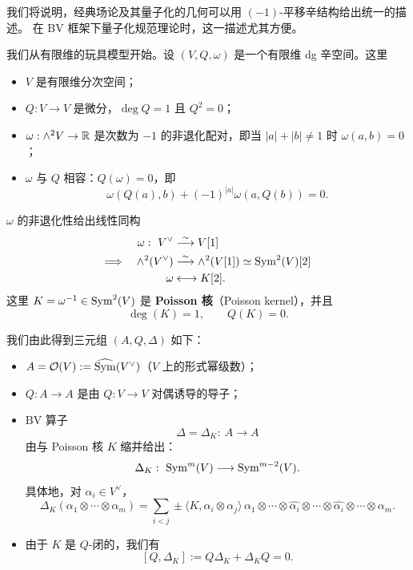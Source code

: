 我们将说明，经典场论及其量子化的几何可以用 $(-1)$-平移辛结构给出统一的描述。
在 BV 框架下量子化规范理论时，这一描述尤其方便。

我们从有限维的玩具模型开始。设 $(V,Q,\omega)$ 是一个有限维 dg 辛空间。这里
\begin{itemize}[leftmargin=1.6em,itemsep=0.2em]
  \item $V$ 是有限维分次空间；
  \item $Q:V\to V$ 是微分，$\deg Q=1$ 且 $Q^2=0$；
  \item $\omega:\wedge^2V\to\mathbb{R}$ 是次数为 $-1$ 的非退化配对，即当 $|a|+|b|\neq 1$ 时
        $\omega(a,b)=0$；
  \item $\omega$ 与 $Q$ 相容：$Q(\omega)=0$，即
        \[
          \omega(Q(a),b)+(-1)^{|a|}\omega(a,Q(b))=0.
        \]
\end{itemize}

$\omega$ 的非退化性给出线性同构
\[
  \begin{aligned}
    \omega:\ V^{\vee}&\overset{\sim}{\longrightarrow}V[1]\\
    \Longrightarrow\quad
    \wedge^2(V^{\vee})&\overset{\sim}{\longrightarrow}\wedge^2(V[1])
      \simeq\operatorname{Sym}^2(V)[2]\\
    \omega&\longleftrightarrow K[2].
  \end{aligned}
\]
这里 $K=\omega^{-1}\in\operatorname{Sym}^2(V)$ 是 \textbf{Poisson 核}（Poisson kernel），并且
\[
  \deg(K)=1,\qquad Q(K)=0.
\]


我们由此得到三元组 $(A,Q,\Delta)$ 如下：
\begin{itemize}[leftmargin=1.6em,itemsep=0.2em]
  \item $A=\mathcal{O}(V):=\widehat{\operatorname{Sym}}(V^{\vee})$（$V$ 上的形式幂级数）；
  \item $Q:A\to A$ 是由 $Q:V\to V$ 对偶诱导的导子；
  \item BV 算子
        \[
          \Delta=\Delta_K:\ A\longrightarrow A
        \]
        由与 Poisson 核 $K$ 缩并给出：
        \[
          \Delta_K:\ \Sym^m(V)\longrightarrow\Sym^{m-2}(V).
        \]
        具体地，对 $\alpha_i\in V^{\vee}$，
        \[
          \Delta_K(\alpha_1\otimes\cdots\otimes\alpha_m)
          =\sum_{i<j}\pm\langle K,\alpha_i\otimes\alpha_j\rangle\,
            \alpha_1\otimes\cdots\otimes\widehat{\alpha_i}\otimes\cdots
            \otimes\widehat{\alpha_i}\otimes\cdots\otimes\alpha_m.
        \]
  \item 由于 $K$ 是 $Q$-闭的，我们有
        \[
          [Q,\Delta_K]:=Q\Delta_K+\Delta_K Q=0.
        \]
\end{itemize}

